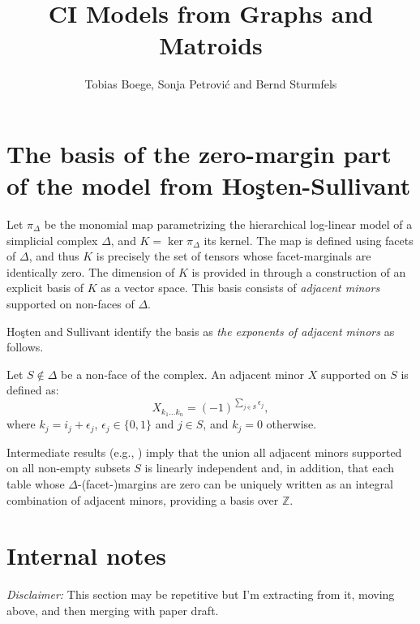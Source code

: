 \documentclass[12pt]{extarticle}
\title{\bf  CI Models from Graphs and Matroids}
\author{Tobias Boege, Sonja Petrovi\'c and Bernd Sturmfels}
\date{}
\theoremstyle{definition}
\numberwithin{theorem}{section}
\begin{document}
\maketitle




\section*{The basis of the zero-margin part of the model from Ho\c{s}ten-Sullivant} 

Let $\pi_\Delta$ be the monomial map parametrizing the hierarchical log-linear model of a simplicial complex $\Delta$, and $K=\ker \pi_\Delta$ its kernel. The map is defined using facets of $\Delta$, and thus $K$ is precisely the set of tensors whose facet-marginals are identically zero. 
The dimension of $K$ is provided in \cite[Theorem 2.6]{HoSu02} through a construction of an explicit basis of $K$ as a vector space.  This basis consists of  \emph{adjacent minors} supported on non-faces of $\Delta$. 
 
Ho\c{s}ten and Sullivant identify  the basis as \emph{the exponents of adjacent minors}  as follows. 

Let $S\not\in\Delta$ be a non-face of the complex. An adjacent minor $X$ supported on $S$ is defined as: 
\[
	X_{k_1\dots k_n} =(-1)^{\sum_{j\in S}\epsilon_j}, 
\]
where $k_j=i_j+\epsilon_j$, $\epsilon_j\in\{0,1\}$ and $j\in S$, and $k_j=0$ otherwise.

Intermediate results (e.g.,  \cite[Lemma 2.1]{HoSu02}) imply that the union all adjacent minors supported on all non-empty subsets $S$ is  linearly independent and, in addition, that each table whose $\Delta$-(facet-)margins are zero can be uniquely written as an integral combination of adjacent minors, providing a basis over $\mathbb Z$. 


\section*{Internal notes} 
\emph{Disclaimer:} This section may be repetitive but I'm extracting from it, moving above, and then merging with paper draft. 
\end{document}
